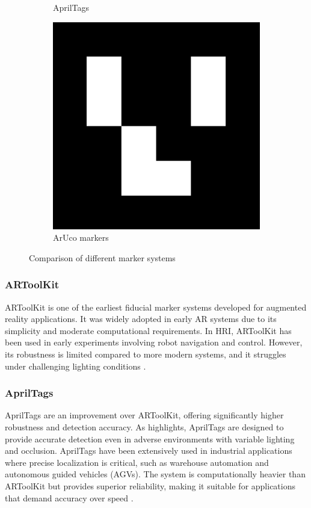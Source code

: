 \begin{figure}[H]
\begin{subfigure}[b]{0.25\textwidth}
        \caption{AprilTags}
        \label{fig:apriltags}
    \end{subfigure}
    \hfill
    \begin{subfigure}[b]{0.25\textwidth}
        \centering
        \includegraphics[width=\textwidth]{ch1/figs/ArUco.png}
        \caption{ArUco markers}
        \label{fig:aruco}
    \end{subfigure}
    \caption{Comparison of different marker systems}
    \label{fig:markers}
\end{figure}


\subsubsection{ARToolKit}
ARToolKit is one of the earliest fiducial marker systems developed for augmented reality applications. It was widely adopted in early AR systems due to its simplicity and moderate computational requirements. In HRI, ARToolKit has been used in early experiments involving robot navigation and control. However, its robustness is limited compared to more modern systems, and it struggles under challenging lighting conditions \cite{Suzuki2022}.

\subsubsection{AprilTags}
AprilTags are an improvement over ARToolKit, offering significantly higher robustness and detection accuracy. As \cite{Daponte2020} highlights, AprilTags are designed to provide accurate detection even in adverse environments with variable lighting and occlusion. AprilTags have been extensively used in industrial applications where precise localization is critical, such as warehouse automation and autonomous guided vehicles (AGVs). The system is computationally heavier than ARToolKit but provides superior reliability, making it suitable for applications that demand accuracy over speed \cite{Filus2023}.


